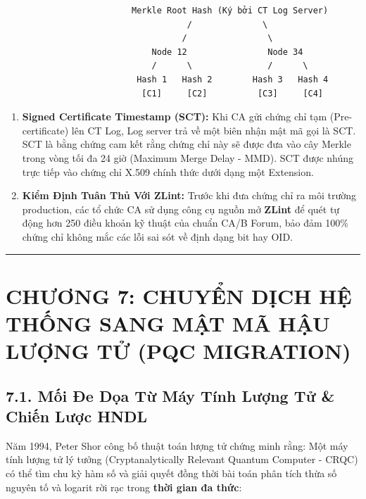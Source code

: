 \documentclass[
]{article}
\providecommand{\tightlist}{%
  \setlength{\itemsep}{0pt}\setlength{\parskip}{0pt}}
\begin{document}
\begin{verbatim}
                         Merkle Root Hash (Ký bởi CT Log Server)
                                    /              \
                                   /                \
                             Node 12                Node 34
                             /      \               /      \
                          Hash 1   Hash 2        Hash 3   Hash 4
                           [C1]     [C2]          [C3]     [C4]
\end{verbatim}

\begin{enumerate}
\def\labelenumi{\arabic{enumi}.}
\setcounter{enumi}{2}
\tightlist
\item
  \textbf{Signed Certificate Timestamp (SCT):} Khi CA gửi chứng chỉ tạm
  (Pre-certificate) lên CT Log, Log server trả về một biên nhận mật mã
  gọi là SCT. SCT là bằng chứng cam kết rằng chứng chỉ này sẽ được đưa
  vào cây Merkle trong vòng tối đa 24 giờ (Maximum Merge Delay - MMD).
  SCT được nhúng trực tiếp vào chứng chỉ X.509 chính thức dưới dạng một
  Extension.
\item
  \textbf{Kiểm Định Tuân Thủ Với ZLint:} Trước khi đưa chứng chỉ ra môi
  trường production, các tổ chức CA sử dụng công cụ nguồn mở
  \textbf{ZLint} để quét tự động hơn 250 điều khoản kỹ thuật của chuẩn
  CA/B Forum, bảo đảm 100\% chứng chỉ không mắc các lỗi sai sót về định
  dạng bit hay OID.
\end{enumerate}

\begin{center}\rule{0.5\linewidth}{0.5pt}\end{center}

\section{CHƯƠNG 7: CHUYỂN DỊCH HỆ THỐNG SANG MẬT MÃ HẬU LƯỢNG TỬ (PQC
MIGRATION)}\label{chux1b0ux1a1ng-7-chuyux1ec3n-dux1ecbch-hux1ec7-thux1ed1ng-sang-mux1eadt-muxe3-hux1eadu-lux1b0ux1ee3ng-tux1eed-pqc-migration}

\subsection{7.1. Mối Đe Dọa Từ Máy Tính Lượng Tử \& Chiến Lược
HNDL}\label{mux1ed1i-ux111e-dux1ecda-tux1eeb-muxe1y-tuxednh-lux1b0ux1ee3ng-tux1eed-chiux1ebfn-lux1b0ux1ee3c-hndl}

Năm 1994, Peter Shor công bố thuật toán lượng tử chứng minh rằng: Một
máy tính lượng tử lý tưởng (Cryptanalytically Relevant Quantum Computer
- CRQC) có thể tìm chu kỳ hàm số và giải quyết đồng thời bài toán phân
tích thừa số nguyên tố và logarit rời rạc trong \textbf{thời gian đa
thức}:
\end{document}
